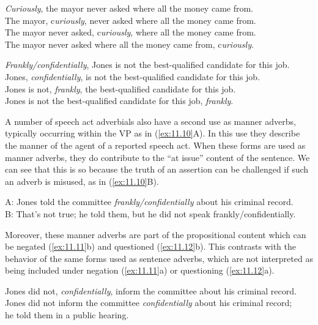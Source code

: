 \ea \label{ex:11.8}
\ea \textit{Curiously}, the mayor never asked where all the money came from.\\
\ex The mayor, c\textit{uriously}, never asked where all the money came from.\\
\ex The mayor never asked, c\textit{uriously}, where all the money came from.\\
\ex The mayor never asked where all the money came from, c\textit{uriously}.
                       \z
\z

\ea \label{ex:11.9}
\ea \textit{Frankly/confidentially}, Jones is not the best-qualified candidate for this job.\\
\ex Jones, \textit{confidentially}, is not the best-qualified candidate for this job.\\
\ex Jones is not, \textit{frankly}, the best-qualified candidate for this job.\\
\ex Jones is not the best-qualified candidate for this job, \textit{frankly}.
                       \z
\z


A number of speech act adverbials also have a second use as manner adverbs, typically occurring within the VP as in (\ref{ex:11.10}A). In this use they describe the manner of the agent of a reported speech act. When these forms are used as manner adverbs, they do contribute to the “at issue” content of the sentence. We can see that this is so because the truth of an assertion can be challenged if such an adverb is misused, as in (\ref{ex:11.10}B).


\ea \label{ex:11.10}
A: Jones told the committee \textit{frankly/confidentially} about his criminal record.\\
B: That’s not true; he told them, but he did not speak frankly/confidentially.
\z


Moreover, these manner adverbs are part of the propositional content which can be negated (\ref{ex:11.11}b) and questioned (\ref{ex:11.12}b). This contrasts with the behavior of the same forms used as sentence adverbs, which are not interpreted as being included under negation (\ref{ex:11.11}a) or questioning (\ref{ex:11.12}a).


\ea \label{ex:11.11}
\ea Jones did not, \textit{confidentially}, inform the committee about his criminal record.\\
\ex Jones did not inform the committee \textit{confidentially} about his criminal record;\\
  he told them in a public hearing.
                       \z
\z

